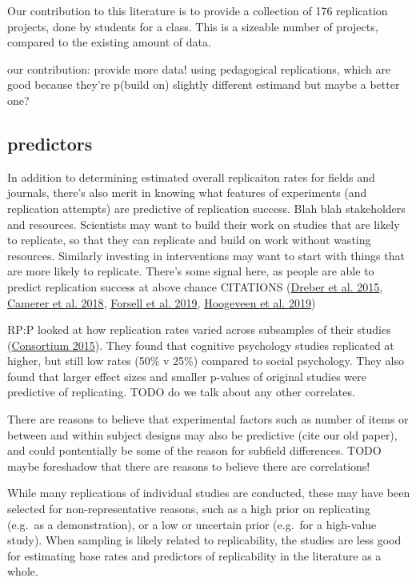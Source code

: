 \documentclass[
  english,
  a4paper,
]{article}
\begin{document}
Our contribution to this literature is to provide a collection of 176 replication projects, done by students for a class. This is a sizeable number of projects, compared to the existing amount of data.

our contribution: provide more data!
using pedagogical replications, which are good because they're p(build on)
slightly different estimand but maybe a better one?

\hypertarget{predictors}{%
\subsection{predictors}\label{predictors}}

In addition to determining estimated overall replicaiton rates for fields and journals, there's also merit in knowing what features of experiments (and replication attempts) are predictive of replication success. Blah blah stakeholders and resources. Scientists may want to build their work on studies that are likely to replicate, so that they can replicate and build on work without wasting resources. Similarly investing in interventions may want to start with things that are more likely to replicate. There's some signal here, as people are able to predict replication success at above chance CITATIONS (\protect\hyperlink{ref-dreber2015}{Dreber et al. 2015}, \protect\hyperlink{ref-camerer2018}{Camerer et al. 2018}, \protect\hyperlink{ref-forsell2019}{Forsell et al. 2019}, \protect\hyperlink{ref-hoogeveen2019}{Hoogeveen et al. 2019})

RP:P looked at how replication rates varied across subsamples of their studies (\protect\hyperlink{ref-openscienceconsortium2015}{Consortium 2015}). They found that cognitive psychology studies replicated at higher, but still low rates (50\% v 25\%) compared to social psychology. They also found that larger effect sizes and smaller p-values of original studies were predictive of replicating. TODO do we talk about any other correlates.

There are reasons to believe that experimental factors such as number of items or between and within subject designs may also be predictive (cite our old paper), and could pontentially be some of the reason for subfield differences. TODO maybe foreshadow that there are reasons to believe there are correlations!

While many replications of individual studies are conducted, these may have been selected for non-representative reasons, such as a high prior on replicating (e.g.~as a demonstration), or a low or uncertain prior (e.g.~for a high-value study). When sampling is likely related to replicability, the studies are less good for estimating base rates and predictors of replicability in the literature as a whole.
\end{document}
